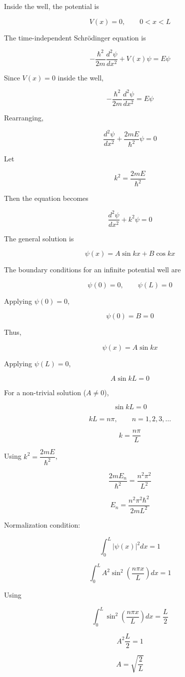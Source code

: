 \documentclass[a4paper, 12pt]{article}
\begin{document}
Inside the well, the potential is

\[
V(x)=0, \qquad 0<x<L
\]

The time-independent Schrödinger equation is

\[
-\frac{\hbar^2}{2m}\frac{d^2\psi}{dx^2}+V(x)\psi=E\psi
\]

Since $V(x)=0$ inside the well,

\[
-\frac{\hbar^2}{2m}\frac{d^2\psi}{dx^2}=E\psi
\]

Rearranging,

\[
\frac{d^2\psi}{dx^2} + \frac{2mE}{\hbar^2}\psi = 0
\]

Let

\[
k^2 = \frac{2mE}{\hbar^2}
\]

Then the equation becomes

\[
\frac{d^2\psi}{dx^2}+k^2\psi=0
\]

The general solution is

\[
\psi(x)=A\sin kx + B\cos kx
\]

The boundary conditions for an infinite potential well are

\[
\psi(0)=0, \qquad \psi(L)=0
\]

Applying $\psi(0)=0$,

\[
\psi(0)=B=0
\]

Thus,

\[
\psi(x)=A\sin kx
\]

Applying $\psi(L)=0$,

\[
A\sin kL=0
\]

For a non-trivial solution ($A\neq 0$),

\[
\sin kL=0
\]

\[
kL=n\pi, \qquad n=1,2,3,\dots
\]

\[
k=\frac{n\pi}{L}
\]

Using $k^2=\dfrac{2mE}{\hbar^2}$,

\[
\frac{2mE_n}{\hbar^2}=\frac{n^2\pi^2}{L^2}
\]

\[
E_n=\frac{n^2\pi^2\hbar^2}{2mL^2}
\]

Normalization condition:

\[
\int_0^L |\psi(x)|^2 dx =1
\]

\[
\int_0^L A^2\sin^2\left(\frac{n\pi x}{L}\right)dx=1
\]

Using

\[
\int_0^L \sin^2\left(\frac{n\pi x}{L}\right)dx=\frac{L}{2}
\]

\[
A^2\frac{L}{2}=1
\]

\[
A=\sqrt{\frac{2}{L}}
\]
\end{document}
